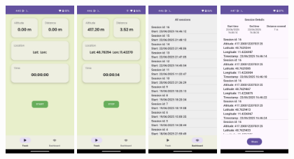 \documentclass[12pt]{article}
\begin{document}
\begin{figure}[h!]
    \centering
    \includegraphics[width=0.23\textwidth]{Project_Screenshots/java1.png}
    \includegraphics[width=0.23\textwidth]{Project_Screenshots/java2.png}
    \includegraphics[width=0.23\textwidth]{Project_Screenshots/java3.png}
    \includegraphics[width=0.23\textwidth]{Project_Screenshots/java4.png}

\end{figure}
\end{document}
